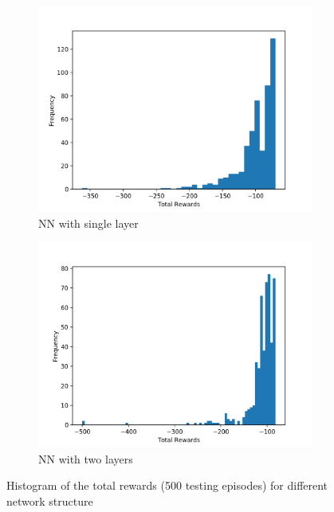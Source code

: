 \documentclass[11pt]{article}
\begin{document}
\begin{figure}[h]
  \begin{subfigure}{0.5\textwidth}
    \centering
    \includegraphics[width=1.0\linewidth]{histogram_m1.png}
    \caption{NN with single layer}
  \end{subfigure}%
    \begin{subfigure}{0.5\textwidth}
    \centering
    \includegraphics[width=1.0\linewidth]{histogram_m2.png}
    \caption{NN with two layers}
  \end{subfigure}%
  \caption{Histogram of the total rewards (500 testing episodes) for different network structure}
\end{figure}
\end{document}
